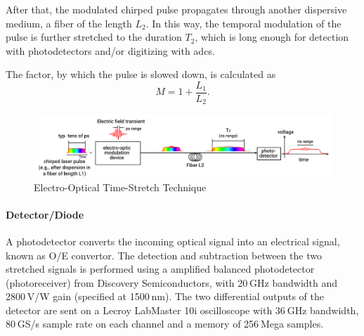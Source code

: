 After that, the modulated chirped pulse propagates through another dispersive medium, a fiber of the length $L_2$.
In this way, the temporal modulation of the pulse is further stretched to the duration $T_2$, which is long enough for detection with photodetectors and/or digitizing with \Glspl{adc}. \cite{roussel2014}

The factor, by which the pulse is slowed down, is calculated as
\begin{equation}
	M = 1 + \frac{L_1}{L_2}.
\end{equation}

\begin{figure}[tbh]
	\centering
	\includegraphics[width = \textwidth]{chap/02-theory/img/time_stretch.png}
	\caption{Electro-Optical Time-Stretch Technique \cite{szwaj}}
	\label{fig:eo_ts}
\end{figure}


\paragraph{Detector/Diode}
A photodetector converts the incoming optical signal into an electrical signal, known as O/E convertor.
The detection and subtraction between the two stretched signals is performed using a amplified balanced photodetector (photoreceiver) from Discovery Semiconductors, with 20 GHz bandwidth and 2800 V/W gain (specified at 1500 nm). The two differential outputs of the detector are sent on a Lecroy LabMaster 10i oscilloscope with 36 GHz bandwidth, 80 GS/s sample rate on each channel and a memory of 256 Mega samples.

